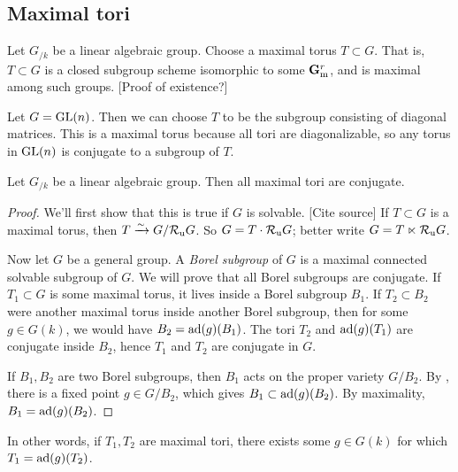 \subsection{Maximal tori}

Let $G_{/k}$ be a linear algebraic group. Choose a maximal torus $T\subset G$. 
That is, $T\subset G$ is a closed subgroup scheme isomorphic to some $\mathbf{G}_\mathrm{m}^r$, 
and is maximal among such groups. [Proof of existence?]

\begin{example}
Let $G=\operatorname{GL}(n)$. Then we can choose $T$ to be the subgroup consisting of 
diagonal matrices. This is a maximal torus because all tori are diagonalizable, 
so any torus in $\operatorname{GL}(n)$ is conjugate to a subgroup of $T$. 
\end{example}

\begin{theorem}
Let $G_{/k}$ be a linear algebraic group. Then all maximal tori are conjugate. 
\end{theorem}
\begin{proof}
We'll first show that this is true if $G$ is solvable. [Cite source]
If $T\subset G$ is a maximal torus, then $T\xrightarrow\sim G/\mathcal{R}_\mathrm{u} G$. So 
$G=T\cdot \mathcal{R}_\mathrm{u} G$; better write $G=T\ltimes \mathcal{R}_\mathrm{u} G$. 

Now let $G$ be a general group. A \emph{Borel subgroup} of $G$ is a maximal 
connected solvable subgroup of $G$. We will prove that all Borel subgroups are 
conjugate. If $T_1\subset G$ is some maximal torus, it lives inside a Borel 
subgroup $B_1$. If $T_2\subset B_2$ were another maximal torus inside another 
Borel subgroup, then for some $g\in G(k)$, we would have 
$B_2=\operatorname{ad}(g)(B_1)$. The tori $T_2$ and $\operatorname{ad}(g)(T_1)$ are conjugate 
inside $B_2$, hence $T_1$ and $T_2$ are conjugate in $G$. 

If $B_1,B_2$ are two Borel subgroups, then $B_1$ acts on the proper variety 
$G/B_2$. By \cite{thm:borel-fixed}, there is a fixed point 
$g\in G/B_2$, which gives $B_1\subset \operatorname{ad}(g)(B_2)$. By maximality, 
$B_1=\operatorname{ad}(g)(B_2)$. 
\end{proof}

In other words, if $T_1,T_2$ are maximal tori, there exists some 
$g\in G(k)$ for which $T_1=\operatorname{ad}(g)(T_2)$. 

